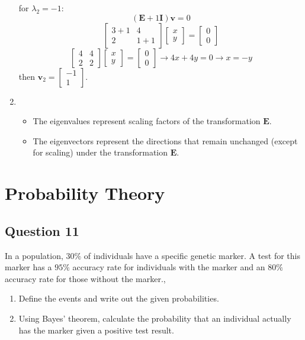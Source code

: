 \documentclass{article}
\begin{document}
\begin{enumerate}
    for $\lambda_2=-1$:
    $$ (\mathbf{E} +1 \mathbf{I})\mathbf{v}=0$$
    $$ \left[ \begin{array}{cc} 3+1 & 4 \\ 2 & 1+1\end{array} \right] \left[ \begin{array}{c} x \\ y \end{array} \right] = \left[ \begin{array}{c} 0 \\ 0 \end{array} \right]$$
    $$ \left[ \begin{array}{cc} 4 & 4 \\ 2 & 2\end{array} \right] \left[ \begin{array}{c} x \\ y \end{array} \right] = \left[ \begin{array}{c} 0 \\ 0 \end{array} \right] \rightarrow 4x+4y=0 \rightarrow x=-y$$
    then $\mathbf{v}_2 = \left[ \begin{array}{c} -1 \\ 1 \end{array} \right]$.
    \item \begin{itemize}
        \item The eigenvalues represent scaling factors of the transformation $\mathbf{E}$.
        \item The eigenvectors represent the directions that remain unchanged (except for scaling) under the transformation $\mathbf{E}$.
    \end{itemize}
\end{enumerate}

\section{Probability Theory}
\subsection{Question 11}
In a population, $30\%$ of individuals have a specific genetic marker. A test for this marker has a $95\%$ accuracy rate for individuals with the marker and an $80\% $ accuracy rate for those without the marker.,
\begin{enumerate}
    \item Define the events and write out the given probabilities.
    \item Using Bayes' theorem, calculate the probability that an individual actually has the marker given a positive test result.
\end{enumerate}
\end{document}
